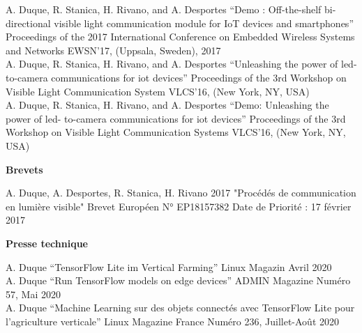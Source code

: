 \documentclass[]{cv-style}          %
\begin{document}
\begin{publist}
\pub
{A. Duque, R. Stanica, H. Rivano, and A. Desportes}
{“Demo : Off-the-shelf bi-directional visible light communication module for IoT devices and smartphones”}
{Proceedings of the 2017 International Conference on Embedded Wireless Systems and Networks}
{EWSN’17, (Uppsala, Sweden), 2017}\\
\pub
  {A. Duque, R. Stanica, H. Rivano, and A. Desportes}
  {“Unleashing the power of led- to-camera communications for iot devices”}
  {Proceedings of the 3rd Workshop on Visible Light Communication System}
  {VLCS’16, (New York, NY, USA)}\\
\pub
  {A. Duque, R. Stanica, H. Rivano, and A. Desportes} {“Demo: Unleashing the power of led- to-camera communications for iot devices”} {Proceedings of the 3rd Workshop on Visible Light Communication Systems} {VLCS’16, (New York, NY, USA)}
\end{publist}


\large{\textbf{Brevets}}

\normalsize
\begin{publist}
\pat
{A. Duque, A. Desportes,  R. Stanica, H. Rivano}
{2017}
{"Procédés de communication en lumière visible"}
{Brevet Européen N° EP18157382}
{Date de Priorité : 17 février 2017}
\\
\end{publist}
\newpage
\large{\textbf{Presse technique}}

\normalsize
\begin{publist}
\pub
  {A. Duque} {“TensorFlow Lite im Vertical Farming”} {Linux Magazin } {Avril 2020}\\
\pub
  {A. Duque} {“Run TensorFlow models on edge devices”} {ADMIN Magazine} {Numéro 57, Mai 2020}\\
\pub
  {A. Duque} {“Machine Learning sur des objets connectés avec TensorFlow Lite pour l’agriculture verticale”} {Linux Magazine France} {Numéro 236, Juillet-Août 2020}
  
\end{publist}


\end{document}
